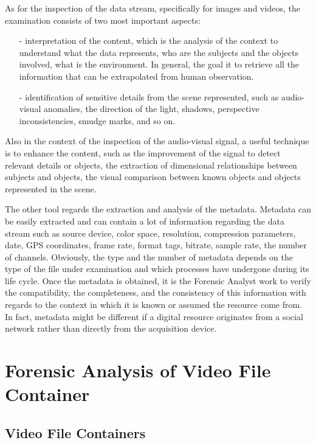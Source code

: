 As for the inspection of the data stream, specifically for images and videos, the examination consists of two most important aspects:
\begin{itemize}
\item[-] interpretation of the content, which is the analysis of the context to understand what the data represents, who are the subjects and the objects involved, what is the environment. In general, the goal it to retrieve all the information that can be extrapolated from human observation.
\item[-] identification of sensitive details from the scene represented, such as audio-visual anomalies, the direction of the light, shadows, perspective inconsistencies, smudge marks, and so on.
\end{itemize}

Also in the context of the inspection of the audio-visual signal, a useful technique is to enhance the content, such as the improvement of the signal to detect relevant details or objects, the extraction of dimensional relationships between subjects and objects, the visual comparison between known objects and objects represented in the scene.

The other tool regards the extraction and analysis of the metadata. Metadata can be easily extracted and can contain a lot of information regarding the data stream such as source device, color space, resolution, compression parameters, date, GPS coordinates, frame rate, format tags, bitrate, sample rate, the number of channels. Obviously, the type and the number of metadata depends on the type of the file under examination and which processes have undergone during its life cycle. Once the metadata is obtained, it is the Forensic Analyst work to verify the compatibility, the completeness, and the consistency \cite{Piva} of this information with regards to the context in which it is known or assumed the resource come from. In fact, metadata might be different if a digital resource originates from a social network rather than directly from the acquisition device.

\section{Forensic Analysis of Video File Container}

\subsection{Video File Containers}

